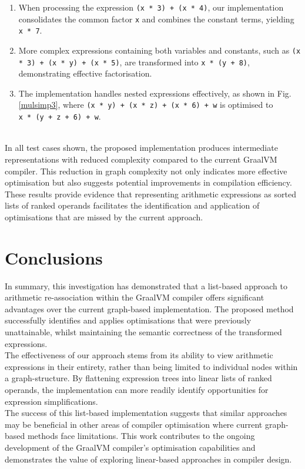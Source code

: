 \documentclass[12pt,openany,a4paper]{book}
\newcommand{\fig}[1]  {Fig.\,\ref{#1}}		%
\begin{document}
\begin{enumerate}
    \item{When processing the expression \verb|(x * 3) + (x * 4)|, our
        implementation consolidates the common factor \verb|x| and combines
        the constant terms, yielding \verb|x * 7|.}
    \item{More complex expressions containing both variables and constants,
        such as \verb|(x * 3) + (x * y) + (x * 5)|, are transformed into
        \verb|x * (y + 8)|, demonstrating effective factorisation.}
    \item{The implementation handles nested expressions effectively, as
        shown in \fig{mulsimp3}, where \verb|(x * y) + (x * z) + (x * 6) + w|
        is optimised to \\ \verb|x * (y + z + 6) + w|.}
\end{enumerate}
~\\
In all test cases shown, the proposed implementation produces intermediate
representations with reduced complexity compared to the current GraalVM
compiler. This reduction in graph complexity not only indicates more effective
optimisation but also suggests potential improvements in compilation
efficiency. These results provide evidence that representing arithmetic
expressions as sorted lists of ranked operands facilitates the identification
and application of optimisations that are missed by the current approach.

\chapter{Conclusions}
\label{conclusion}

In summary, this investigation has demonstrated that a list-based approach to
arithmetic re-association within the GraalVM compiler offers significant
advantages over the current graph-based implementation. The proposed method
successfully identifies and applies optimisations that were previously
unattainable, whilst maintaining the semantic correctness of the transformed
expressions. \\
The effectiveness of our approach stems from its ability to view arithmetic
expressions in their entirety, rather than being limited to individual nodes
within a graph-structure. By flattening expression trees into linear lists
of ranked operands, the implementation can more readily identify
opportunities for expression simplifications. \\
The success of this list-based implementation suggests that similar approaches
may be beneficial in other areas of compiler optimisation where current
graph-based methods face limitations. This work contributes to the 
ongoing development of the GraalVM compiler's optimisation capabilities
and demonstrates the value of exploring linear-based approaches in
compiler design.
\end{document}
